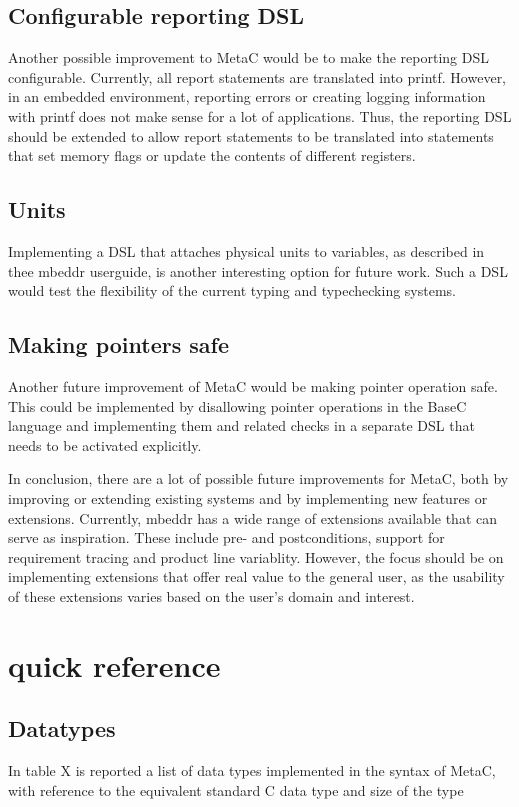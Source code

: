 \documentclass[a4paper,10pt,titlepage]{report}
\begin{document}
\section{Configurable reporting DSL}
Another possible improvement to MetaC would be to make the reporting DSL configurable. Currently, all report statements are translated into printf. However, in an embedded environment, reporting errors or creating logging information with printf does not make sense for a lot of applications. Thus, the reporting DSL should be extended to allow report statements to be translated into statements that set memory flags or update the contents of different registers.

\section{Units}
Implementing a DSL that attaches physical units to variables, as described in thee mbeddr userguide, is another interesting option for future work. Such a DSL would test the flexibility of the current typing and typechecking systems.

\section{Making pointers safe}
Another future improvement of MetaC would be making pointer operation safe. This could be implemented by disallowing pointer operations in the BaseC language and implementing them and related checks in a separate DSL that needs to be activated explicitly.

In conclusion, there are a lot of possible future improvements for MetaC, both by improving or extending existing systems and by implementing new features or extensions. Currently, mbeddr has a wide range of extensions available that can serve as inspiration. These include pre- and postconditions, support for requirement tracing and product line variablity. However, the focus should be on implementing extensions that offer real value to the general user, as the usability of these extensions varies based on the user's domain and interest.  





\appendix
\chapter{quick reference}
\section{Datatypes}
In table X is reported a list of data types implemented in the syntax of MetaC, with reference to the equivalent standard C data type and size of the type
\end{document}

